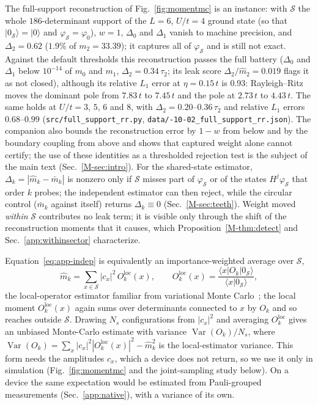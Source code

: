 \documentclass[aps,prb,onecolumn,superscriptaddress,longbibliography,floatfix]{revtex4-2}
\begin{document}
The full-support reconstruction of Fig.~\ref{fig:momentmc} is an instance: with $\mathcal{S}$ the whole $186$-determinant support of the $L=6$, $U/t=4$ ground state (so that $|0_\mathcal{S}\rangle=|0\rangle$ and $\varphi_\mathcal{S}=\varphi_0$), $w=1$, $\Delta_0$ and $\Delta_1$ vanish to machine precision, and $\Delta_2=0.62$ ($1.9\%$ of ${m_2=33.39}$); it captures all of $\varphi_\mathcal{S}$ and is still not exact. Against the default thresholds this reconstruction passes the full battery ($\Delta_0$ and $\Delta_1$ below $10^{-14}$ of $m_0$ and $m_1$, $\Delta_2=0.34\,\tau_2$; its leak score $\Delta_2/\widehat m_2=0.019$ flags it as not closed), although its relative $L_1$ error at $\eta=0.15\,t$ is $0.93$: Rayleigh--Ritz moves the dominant pole from $7.83\,t$ to $7.45\,t$ and the pole at $2.73\,t$ to $4.43\,t$. The same holds at $U/t=3$, $5$, $6$ and $8$, with $\Delta_2=0.20$--$0.36\,\tau_2$ and relative $L_1$ errors $0.68$--$0.99$ (\texttt{src/\allowbreak full\_support\_rr.py}, \texttt{data/-10-02\_full\_support\_rr.json}). The companion also bounds the reconstruction error by $1-w$ from below and by the boundary coupling from above and shows that captured weight alone cannot certify; the use of these identities as a thresholded rejection test is the subject of the main text (Sec.~\ref{M-sec:intro}). For the shared-state estimator, $\Delta_k=|\widehat{m}_k-\bar m_k|$ is nonzero only if $\mathcal{S}$ misses part of $\varphi_\mathcal{S}$ or of the states $H^j\varphi_\mathcal{S}$ that order $k$ probes; the independent estimator can then reject, while the circular control ($\bar m_k$ against itself) returns $\Delta_k\equiv 0$ (Sec.~\ref{M-sec:teeth}). Weight moved \emph{within} $\mathcal{S}$ contributes no leak term; it is visible only through the shift of the reconstruction moments that it causes, which Proposition~\ref{M-thm:detect} and Sec.~\ref{app:withinsector} characterize.

Equation~\eqref{eq:app-indep} is equivalently an importance-weighted average over $\mathcal{S}$,
\begin{equation}
\widehat{m}_k=\sum_{x\in\mathcal{S}}|c_x|^2\,O_k^{\mathrm{loc}}(x),\qquad O_k^{\mathrm{loc}}(x)=\frac{\langle x|O_k|0_\mathcal{S}\rangle}{\langle x|0_\mathcal{S}\rangle},
\end{equation}
the local-operator estimator familiar from variational Monte Carlo~\cite{CarleoTroyer2017}; the local moment $O_k^{\mathrm{loc}}(x)$ again sums over determinants connected to $x$ by $O_k$ and so reaches outside $\mathcal{S}$. Drawing $N_s$ configurations from $|c_x|^2$ and averaging $O_k^{\mathrm{loc}}$ gives an unbiased Monte-Carlo estimate with variance $\operatorname{Var}(O_k)/N_s$, where $\operatorname{Var}(O_k)=\sum_x|c_x|^2|O_k^{\mathrm{loc}}(x)|^2-\widehat m_k^2$ is the local-estimator variance. This form needs the amplitudes $c_x$, which a device does not return, so we use it only in simulation (Fig.~\ref{fig:momentmc} and the joint-sampling study below). On a device the same expectation would be estimated from Pauli-grouped measurements (Sec.~\ref{app:native}), with a variance of its own.
\end{document}
